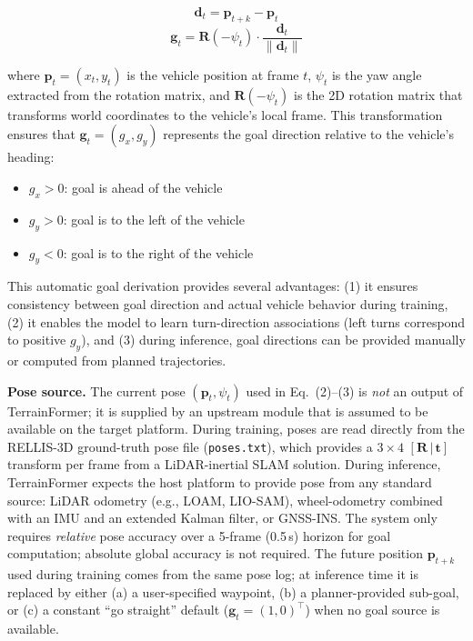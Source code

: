 \documentclass[sensors,article,submit,pdftex,moreauthors]{Definitions/mdpi}
\begin{document}
\begin{equation}
    \mathbf{d}_t = \mathbf{p}_{t+k} - \mathbf{p}_t
\end{equation}
\begin{equation}
    \mathbf{g}_t = \mathbf{R}(-\psi_t) \cdot \frac{\mathbf{d}_t}{\|\mathbf{d}_t\|}
\end{equation}

where $\mathbf{p}_t = (x_t, y_t)$ is the vehicle position at frame $t$, $\psi_t$ is the yaw angle extracted from the rotation matrix, and $\mathbf{R}(-\psi_t)$ is the 2D rotation matrix that transforms world coordinates to the vehicle's local frame. This transformation ensures that $\mathbf{g}_t = (g_x, g_y)$ represents the goal direction relative to the vehicle's heading:
\begin{itemize}
    \item $g_x > 0$: goal is ahead of the vehicle
    \item $g_y > 0$: goal is to the left of the vehicle
    \item $g_y < 0$: goal is to the right of the vehicle
\end{itemize}

This automatic goal derivation provides several advantages: (1) it ensures consistency between goal direction and actual vehicle behavior during training, (2) it enables the model to learn turn-direction associations (left turns correspond to positive $g_y$), and (3) during inference, goal directions can be provided manually or computed from planned trajectories.

\textbf{Pose source.}
The current pose $(\mathbf{p}_t, \psi_t)$ used in Eq.~(2)--(3) is \emph{not} an output of TerrainFormer; it is supplied by an upstream module that is assumed to be available on the target platform. During training, poses are read directly from the RELLIS-3D ground-truth pose file (\texttt{poses.txt}), which provides a $3 \times 4$ \mbox{$[\mathbf{R}\,|\,\mathbf{t}]$} transform per frame from a LiDAR-inertial SLAM solution. During inference, TerrainFormer expects the host platform to provide pose from any standard source: LiDAR odometry (e.g., LOAM, LIO-SAM), wheel-odometry combined with an IMU and an extended Kalman filter, or GNSS-INS. The system only requires \emph{relative} pose accuracy over a 5-frame (0.5\,s) horizon for goal computation; absolute global accuracy is not required. The future position $\mathbf{p}_{t+k}$ used during training comes from the same pose log; at inference time it is replaced by either (a) a user-specified waypoint, (b) a planner-provided sub-goal, or (c) a constant ``go straight'' default ($\mathbf{g}_t = (1, 0)^\top$) when no goal source is available.
\end{document}
